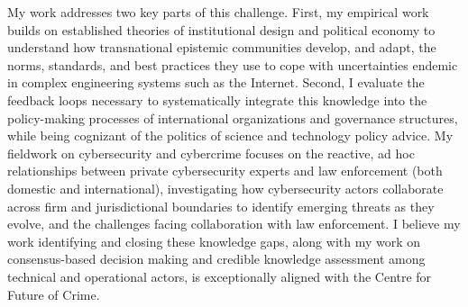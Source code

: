 \documentclass[11pt]{letter}
\begin{document}
\begin{letter}
My work addresses two key parts of this challenge. 
%
First, my empirical work builds on established theories of institutional design and political economy to understand how 
transnational epistemic communities develop, and adapt, the norms, standards, and best practices they use to cope with uncertainties endemic in complex engineering systems such as the Internet.
%
Second, I evaluate the feedback loops necessary to systematically integrate this knowledge into the policy-making processes of international organizations and governance structures, while being cognizant of the politics of science and technology policy advice.
%
My fieldwork on cybersecurity and cybercrime focuses on the reactive, ad hoc relationships between private cybersecurity experts and law enforcement (both domestic and international), investigating how cybersecurity actors collaborate across firm and jurisdictional boundaries to identify emerging threats as they evolve, and the challenges facing collaboration with law enforcement.
%
I believe my work identifying and closing these knowledge gaps, along with my work on consensus-based decision making and credible knowledge assessment among technical and operational actors, is exceptionally aligned with the Centre for Future of Crime.





\end{letter}
\end{document}
